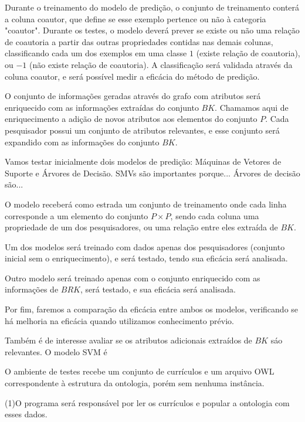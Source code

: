 Durante o treinamento do modelo de predição, o conjunto de treinamento conterá a coluna coautor, que define se esse exemplo pertence ou não à categoria "coautor". Durante os testes, o modelo deverá prever se existe ou não uma relação de coautoria a partir das outras propriedades contidas nas demais colunas, classificando cada um dos exemplos em uma classe $1$ (existe relação de coautoria), ou $-1$ (não existe relação de coautoria). A classificação será validada através da coluna coautor, e será possível medir a eficácia do método de predição.


O conjunto de informações geradas através do grafo com atributos será enriquecido com as informações extraídas do conjunto $BK$. Chamamos aqui de enriquecimento a adição de novos atributos aos elementos do conjunto $P$. Cada pesquisador possui um conjunto de atributos relevantes, e esse conjunto será expandido com as informações do conjunto $BK$.



Vamos testar inicialmente dois modelos de predição: Máquinas de Vetores de Suporte e Árvores de Decisão.
SMVs são importantes porque...
Árvores de decisão são...

O modelo receberá como estrada um conjunto de treinamento onde cada linha corresponde a um elemento do conjunto $P \times P$, sendo cada coluna uma propriedade de um dos pesquisadores, ou uma relação entre eles extraída de $BK$.

Um dos modelos será treinado com dados apenas dos pesquisadores (conjunto inicial sem o enriquecimento), e será testado, tendo sua eficácia será analisada.

Outro modelo será treinado apenas com o conjunto enriquecido com as informações de $BRK$, será testado, e sua eficácia será analisada.

Por fim, faremos a comparação da eficácia entre ambos os modelos, verificando se há melhoria na eficácia quando utilizamos conhecimento prévio.

Também é de interesse avaliar se os atributos adicionais extraídos de $BK$ sáo relevantes. O modelo SVM é %


O ambiente de testes recebe um conjunto de currículos e um arquivo OWL correspondente à estrutura da ontologia, porém sem nenhuma instância.

(1)O programa será responsável por ler os currículos e popular a ontologia com esses dados.

